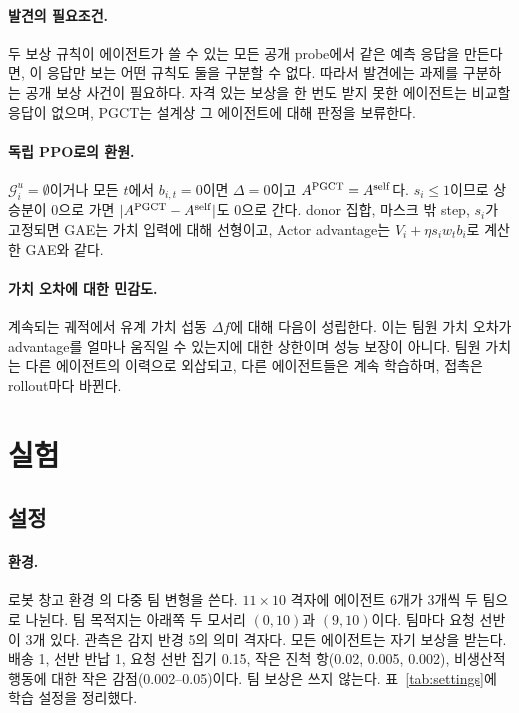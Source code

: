 \documentclass[10pt,twocolumn,letterpaper]{article}
\begin{document}
\paragraph{발견의 필요조건.} 두 보상 규칙이 에이전트가 쓸 수 있는 모든 공개 probe에서 같은 예측 응답을 만든다면, 이 응답만 보는 어떤 규칙도 둘을 구분할 수 없다. 따라서 발견에는 과제를 구분하는 공개 보상 사건이 필요하다. 자격 있는 보상을 한 번도 받지 못한 에이전트는 비교할 응답이 없으며, PGCT는 설계상 그 에이전트에 대해 판정을 보류한다.

\paragraph{독립 PPO로의 환원.} $\mathcal G_i^u=\emptyset$이거나 모든 $t$에서 $b_{i,t}=0$이면 $\Delta=0$이고 $A^{\rm PGCT}=A^{\rm self}$다. $s_i\le1$이므로 상승분이 0으로 가면 $|A^{\rm PGCT}-A^{\rm self}|$도 0으로 간다. donor 집합, 마스크 밖 step, $s_i$가 고정되면 GAE는 가치 입력에 대해 선형이고, Actor advantage는 $V_i+\eta s_i w_t b_i$로 계산한 GAE와 같다.

\paragraph{가치 오차에 대한 민감도.} 계속되는 궤적에서 유계 가치 섭동 $\Delta f$에 대해 다음이 성립한다.
\BoundEquation
이는 팀원 가치 오차가 advantage를 얼마나 움직일 수 있는지에 대한 상한이며 성능 보장이 아니다. 팀원 가치는 다른 에이전트의 이력으로 외삽되고, 다른 에이전트들은 계속 학습하며, 접촉은 rollout마다 바뀐다.

\section{실험}
\subsection{설정}
\paragraph{환경.} 로봇 창고 환경 \citep{benchmark}의 다중 팀 변형을 쓴다. $11\times10$ 격자에 에이전트 6개가 3개씩 두 팀으로 나뉜다. 팀 목적지는 아래쪽 두 모서리 $(0,10)$과 $(9,10)$이다. 팀마다 요청 선반이 3개 있다. 관측은 감지 반경 5의 의미 격자다. 모든 에이전트는 자기 보상을 받는다. 배송 1, 선반 반납 1, 요청 선반 집기 0.15, 작은 진척 항(0.02, 0.005, 0.002), 비생산적 행동에 대한 작은 감점(0.002--0.05)이다. 팀 보상은 쓰지 않는다. 표~\ref{tab:settings}에 학습 설정을 정리했다.
\end{document}
